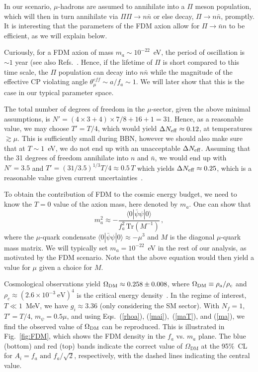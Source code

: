 \documentclass[twocolumn,preprintnumbers,
endnote,prl]{revtex4-1}
\newcommand{\gsim}{\gtrsim}
\newcommand{\beq}{\begin{equation}}
\newcommand{\eeq}{\end{equation}}
\begin{document}
In our scenario, $\mu$-hadrons are assumed to annihilate into a $\Pi$ meson 
population, which will then in turn annihilate via $\Pi \Pi \to n \bar{n}$ or else decay, $\Pi \to n \bar{n}$, promptly.  It is interesting that 
the parameters of the FDM axion allow for 
$\Pi \to \bar n n$ to be efficient, as we will explain below.   

Curiously, for a FDM axion of mass $m_a \sim 10^{-22}$~eV, the period of oscillation is $\sim 1$ year (see also Refs.~\cite{Stadnik:2015kia, Stadnik:2016zkf,Blas:2016ddr}.  Hence, 
if the lifetime of $\Pi$ is short compared to this time scale, the $\Pi$ population 
can decay into $n \bar n$ while the magnitude of 
the effective CP violating angle $\theta_\mu^{eff} \sim a/f_a \sim 1$.  We will later show that this is 
the case in our typical parameter space.  
     

The total number of degrees of freedom in the $\mu$-sector, given the above minimal assumptions, is 
$N' = (4\times 3 + 4) \times 7/8 + 16 + 1 = 31$.  Hence, as a reasonable value, we may choose 
$T'=T/4$, which would yield $\Delta N_{\rm eff}\approx 0.12$, at temperatures $\gsim \mu$.  This is 
sufficiently small during BBN, however we should also make sure that at $T\sim 1$~eV, we do not end up with 
an unacceptable $\Delta N_{\rm eff}$.  Assuming that the 31 degrees of freedom annihilate into $n$ and $\bar n$, 
we would end up with $N'=3.5$ and $T' = (31/3.5)^{1/3} T/4 \approx 0.5 \,T$ which yields $\Delta N_{\rm eff} \approx 0.25$, 
which is a reasonable value given current uncertainties~\cite{Ade:2015xua}.

To obtain the contribution of FDM to the cosmic energy budget, we need to know the $T=0$ value of the axion mass, here denoted by $m_a$.  One can show that~\cite{Georgi:1986df} 
\beq
m_a^2 \approx - \frac{\langle 0| \bar \psi \psi |0\rangle}{f_a^2 \,\text{Tr}(M^{-1})}\,,
\label{ma}
\eeq
where the $\mu$-quark condensate $\langle 0| \bar \psi \psi |0\rangle \approx - \mu^3$ and $M$ is the diagonal 
$\mu$-quark mass matrix.  We will typically set $m_a = 10^{-22}$~eV in the rest of our analysis, as motivated by the 
FDM scenario. Note that the above equation would then yield a value for $\mu$ given a choice for $M$.  
 
Cosmological observations yield $\Omega_{\rm DM} \approx 0.258 \pm 0.008$, where $\Omega_{\rm DM}\equiv \rho_a/\rho_c$ 
and $\rho_c \approx (2.6 \times 10^{-3}~\text{eV})^4$ is the critical energy density~\cite{Ade:2015xua}.   In the regime of interest, $T\ll 1$~MeV, 
we have $g_i \approx 3.36$ (only considering the SM sector).  With $N_f=1$, $T'=T/4$, $m_\psi = 0.5 \mu$, and using Eqs.~(\ref{rhoa}), (\ref{mai}),~(\ref{maT}), and (\ref{ma}), 
we find the observed value of $\Omega_{\rm DM}$ can be reproduced. This is illustrated in Fig.~\ref{fig:FDM}, which shows the FDM density in the $f_a$ vs. $m_a$ plane. The blue (bottom) and red (top) bands indicate the correct value of $\Omega_{\text{DM}}$ at the 95\%~CL for $A_i = f_a \text{ and } f_a / \sqrt{2}$, respectively, with the dashed lines indicating the central value.  
\end{document}
